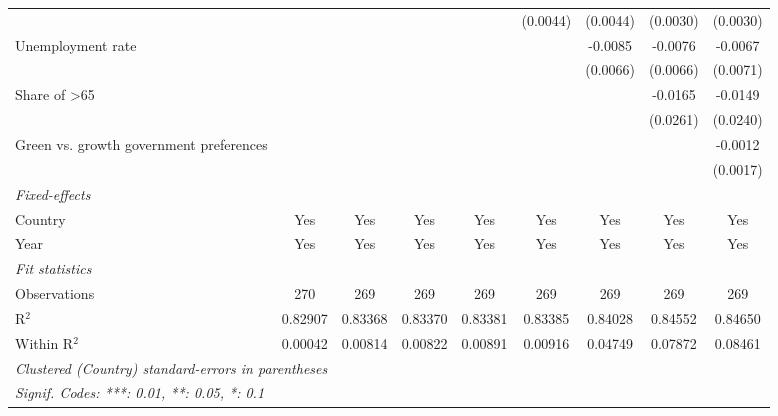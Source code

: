\begin{table}[htbp]
\begin{tabular}{lcccccccc}
                                                              &          &          &          &                       & (0.0044) & (0.0044)              & (0.0030) & (0.0030)\\   
      Unemployment rate                                       &          &          &          &                       &          & -0.0085               & -0.0076  & -0.0067\\   
                                                              &          &          &          &                       &          & (0.0066)              & (0.0066) & (0.0071)\\   
      Share of >65                                            &          &          &          &                       &          &                       & -0.0165  & -0.0149\\   
                                                              &          &          &          &                       &          &                       & (0.0261) & (0.0240)\\   
      Green vs. growth government preferences                 &          &          &          &                       &          &                       &          & -0.0012\\   
                                                              &          &          &          &                       &          &                       &          & (0.0017)\\   
      \midrule
      \emph{Fixed-effects}\\
      Country                                                 & Yes      & Yes      & Yes      & Yes                   & Yes      & Yes                   & Yes      & Yes\\  
      Year                                                    & Yes      & Yes      & Yes      & Yes                   & Yes      & Yes                   & Yes      & Yes\\  
      \midrule
      \emph{Fit statistics}\\
      Observations                                            & 270      & 269      & 269      & 269                   & 269      & 269                   & 269      & 269\\  
      R$^2$                                                   & 0.82907  & 0.83368  & 0.83370  & 0.83381               & 0.83385  & 0.84028               & 0.84552  & 0.84650\\  
      Within R$^2$                                            & 0.00042  & 0.00814  & 0.00822  & 0.00891               & 0.00916  & 0.04749               & 0.07872  & 0.08461\\  
      \midrule \midrule
      \multicolumn{9}{l}{\emph{Clustered (Country) standard-errors in parentheses}}\\
      \multicolumn{9}{l}{\emph{Signif. Codes: ***: 0.01, **: 0.05, *: 0.1}}\\
   \end{tabular}
\end{table}


